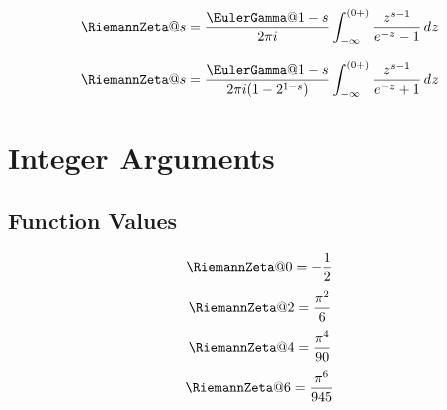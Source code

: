 \documentclass{article}
\begin{document}

\begin{equation}\label{eq:ZE.INT.CI1}%
  \RiemannZeta@{s}
  = \frac{\EulerGamma@{1-s}}{2 \cpi \iunit}
    \int_{-\infty}^{(0+)} \frac{z^{s-1}}{\expe^{-z}-1} \diff{z}
\end{equation}

\begin{equation}\label{eq:ZE.INT.CI2}%
  \RiemannZeta@{s}
  = \frac{\EulerGamma@{1-s}}{2 \cpi \iunit (1 - 2^{1-s})}
    \*
    \int_{-\infty}^{(0+)} \frac{z^{s-1}}{\expe^{-z}+1} \diff{z}
\end{equation}

\section{Integer Arguments}\label{sec:ZE.INA}

\subsection{Function Values}\label{sec:ZE.INA.INT}


  \begin{equation}\label{eq:ZE.INA.INT1.SE1}%
    \RiemannZeta@{0} = - \frac{1}{2}
  \end{equation}
  \begin{equation}\label{eq:ZE.INA.INT1.SE2}%
    \RiemannZeta@{2} = \frac{\cpi^2}{6}
  \end{equation}
  \begin{equation}\label{eq:ZE.INA.INT1.SE3}%
    \RiemannZeta@{4} = \frac{\cpi^4}{90}
  \end{equation}
  \begin{equation}\label{eq:ZE.INA.INT1.SE4}%
    \RiemannZeta@{6} = \frac{\cpi^6}{945}
  \end{equation}
\end{document}

